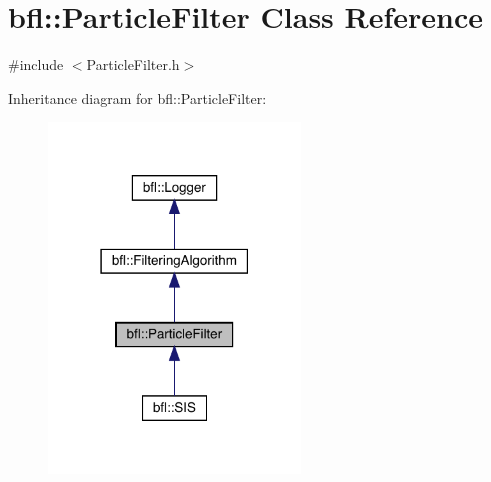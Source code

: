 \hypertarget{classbfl_1_1ParticleFilter}{}\section{bfl\+:\+:Particle\+Filter Class Reference}
\label{classbfl_1_1ParticleFilter}


{\ttfamily \#include $<$Particle\+Filter.\+h$>$}



Inheritance diagram for bfl\+:\+:Particle\+Filter\+:
\nopagebreak
\begin{figure}[H]
\begin{center}
\leavevmode
\includegraphics[width=190pt]{classbfl_1_1ParticleFilter__inherit__graph}
\end{center}
\end{figure}
